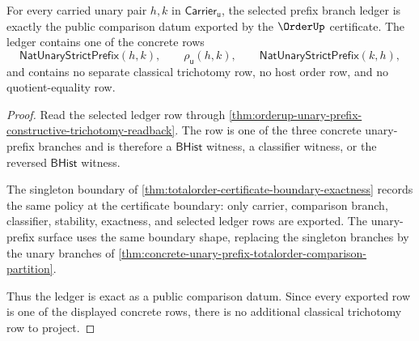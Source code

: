 \begin{theorem}
\label{thm:orderup-prefix-branch-ledger-exactness}
For every carried unary pair $h,k$ in $\mathsf{Carrier}_{\mathsf{u}}$, the
selected prefix branch ledger is exactly the public comparison datum exported by
the $\OrderUp$ certificate. The ledger contains one of the concrete rows
$$
\mathsf{NatUnaryStrictPrefix}(h,k),
\qquad
\rho_{\mathsf{u}}(h,k),
\qquad
\mathsf{NatUnaryStrictPrefix}(k,h),
$$
and contains no separate classical trichotomy row, no host order row, and no
quotient-equality row.
\end{theorem}
\begin{proof}
Read the selected ledger row through
\autoref{thm:orderup-unary-prefix-constructive-trichotomy-readback}. The row is
one of the three concrete unary-prefix branches and is therefore a
$\mathsf{BHist}$ witness, a classifier witness, or the reversed
$\mathsf{BHist}$ witness.

The singleton boundary of
\autoref{thm:totalorder-certificate-boundary-exactness} records the same
policy at the certificate boundary: only carrier, comparison branch,
classifier, stability, exactness, and selected ledger rows are exported. The
unary-prefix surface uses the same boundary shape, replacing the singleton
branches by the unary branches of
\autoref{thm:concrete-unary-prefix-totalorder-comparison-partition}.

Thus the ledger is exact as a public comparison datum. Since every exported row
is one of the displayed concrete rows, there is no additional classical
trichotomy row to project.
\end{proof}

